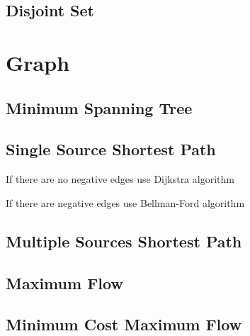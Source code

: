 \documentclass[a4paper,11pt]{article}
\begin{document}
  
  \subsection{Disjoint Set}
        

\section{Graph}
  \subsection{Minimum Spanning Tree}
    

  \subsection{Single Source Shortest Path}
    If there are no negative edges use Dijkstra algorithm
        
    
    If there are negative edges use Bellman-Ford algorithm
    

  \subsection{Multiple Sources Shortest Path}
    
  
  \subsection{Maximum Flow}
    
  
  \subsection{Minimum Cost Maximum Flow}
    
  
\end{document}
